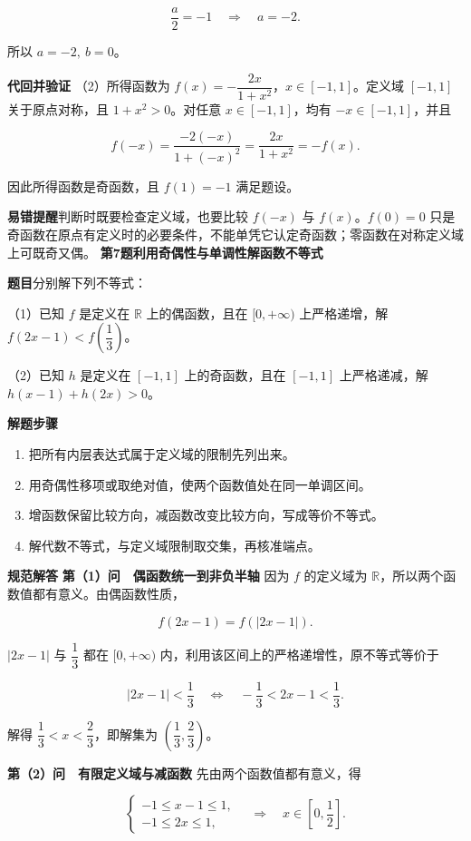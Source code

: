 \documentclass[UTF8,zihao=-4]{ctexart}
\newcommand{\subq}[1]{\par\Needspace{2\baselineskip}（#1）}
\newcommand{\labeltext}[1]{\par\textbf{#1}\quad}
\begin{document}
\[\frac{a}{2}=-1\quad\Longrightarrow\quad a=-2.\]\par
所以 $\boxed{a=-2,\ b=0}$。\par
\par{}
\textbf{代回并验证}\quad
（2）所得函数为 $f(x)=-\dfrac{2x}{1+x^2}$，$x\in[-1,1]$。定义域 $[-1,1]$ 关于原点对称，且 $1+x^2>0$。对任意 $x\in[-1,1]$，均有 $-x\in[-1,1]$，并且\par
\[f(-x)=\frac{-2(-x)}{1+(-x)^2}=\frac{2x}{1+x^2}=-f(x).\]\par
因此所得函数是奇函数，且 $f(1)=-1$ 满足题设。\par
\labeltext{易错提醒}判断时既要检查定义域，也要比较 $f(-x)$ 与 $f(x)$。$f(0)=0$ 只是奇函数在原点有定义时的必要条件，不能单凭它认定奇函数；零函数在对称定义域上可既奇又偶。
\clearpage
{\Large\bfseries 第7题\quad 利用奇偶性与单调性解函数不等式}
\labeltext{题目}分别解下列不等式：
\subq{1}已知 $f$ 是定义在 $\mathbb R$ 上的偶函数，且在 $[0,+\infty)$ 上严格递增，解 $f(2x-1)<f\!\left(\dfrac13\right)$。
\subq{2}已知 $h$ 是定义在 $[-1,1]$ 上的奇函数，且在 $[-1,1]$ 上严格递减，解 $h(x-1)+h(2x)>0$。
\labeltext{解题步骤}\begin{enumerate}
\item 把所有内层表达式属于定义域的限制先列出来。
\item 用奇偶性移项或取绝对值，使两个函数值处在同一单调区间。
\item 增函数保留比较方向，减函数改变比较方向，写成等价不等式。
\item 解代数不等式，与定义域限制取交集，再核准端点。
\end{enumerate}
\labeltext{规范解答}
\textbf{第（1）问　偶函数统一到非负半轴}\quad
因为 $f$ 的定义域为 $\mathbb R$，所以两个函数值都有意义。由偶函数性质，\par
\[f(2x-1)=f(|2x-1|).\]\par
$|2x-1|$ 与 $\dfrac13$ 都在 $[0,+\infty)$ 内，利用该区间上的严格递增性，原不等式等价于\par
\[|2x-1|<\frac13\quad\Longleftrightarrow\quad-\frac13<2x-1<\frac13.\]\par
解得 $\boxed{\dfrac13<x<\dfrac23}$，即解集为 $\boxed{\left(\dfrac13,\dfrac23\right)}$。\par
\par{}
\textbf{第（2）问　有限定义域与减函数}\quad
先由两个函数值都有意义，得\par
\[\begin{cases}-1\le x-1\le1,\\-1\le2x\le1,\end{cases}\quad\Longrightarrow\quad x\in\left[0,\frac12\right].\]\par
\end{document}

